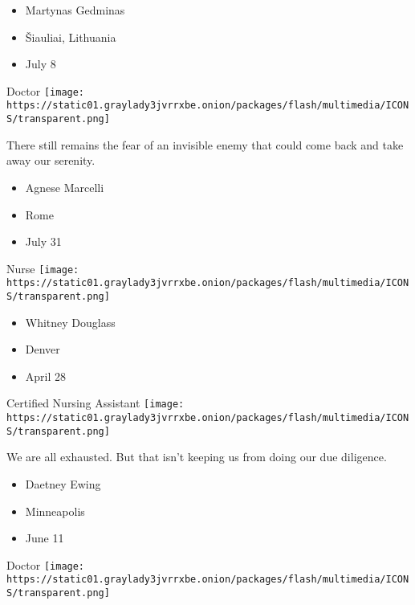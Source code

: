 \begin{itemize}
\tightlist
\item
  Martynas Gedminas
\item
  Šiauliai, Lithuania
\item
  July 8
\end{itemize}

\protect\hyperlink{item-agnese-marcelli}{}

Doctor
\texttt{[image: https://static01.graylady3jvrrxbe.onion/packages/flash/multimedia/ICONS/transparent.png]}

There still remains the fear of an invisible enemy that could come back
and take away our serenity.

\begin{itemize}
\tightlist
\item
  Agnese Marcelli
\item
  Rome
\item
  July 31
\end{itemize}

\protect\hyperlink{item-whitney-douglass}{}

Nurse
\texttt{[image: https://static01.graylady3jvrrxbe.onion/packages/flash/multimedia/ICONS/transparent.png]}

\begin{itemize}
\tightlist
\item
  Whitney Douglass
\item
  Denver
\item
  April 28
\end{itemize}

\protect\hyperlink{item-daetney-ewing}{}

Certified Nursing Assistant
\texttt{[image: https://static01.graylady3jvrrxbe.onion/packages/flash/multimedia/ICONS/transparent.png]}

We are all exhausted. But that isn't keeping us from doing our due
diligence.

\begin{itemize}
\tightlist
\item
  Daetney Ewing
\item
  Minneapolis
\item
  June 11
\end{itemize}

\protect\hyperlink{item-bryan-adrian-priego-parra}{}

Doctor
\texttt{[image: https://static01.graylady3jvrrxbe.onion/packages/flash/multimedia/ICONS/transparent.png]}

